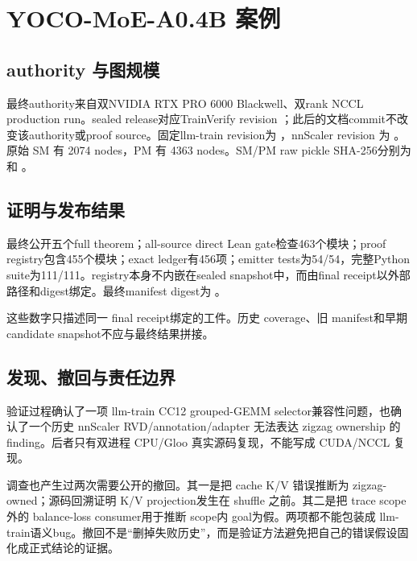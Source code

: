 \documentclass[10.5pt,a4paper]{ctexart}
\begin{document}
\section{YOCO-MoE-A0.4B 案例}

\subsection{authority 与图规模}

最终authority来自双NVIDIA RTX PRO 6000 Blackwell、双rank NCCL production run。sealed release对应TrainVerify revision ；此后的文档commit不改变该authority或proof source。固定llm-train revision为
，nnScaler revision 为
。原始 SM 有 2074 nodes，PM 有 4363 nodes。SM/PM raw pickle SHA-256分别为
和
。

\subsection{证明与发布结果}

最终公开五个full theorem；all-source direct Lean gate检查463个模块；proof registry包含455个模块；exact ledger有456项；emitter tests为54/54，完整Python suite为111/111。registry本身不内嵌在sealed snapshot中，而由final receipt以外部路径和digest绑定。最终manifest digest为
。

这些数字只描述同一 final receipt绑定的工件。历史 coverage、旧 manifest和早期 candidate snapshot不应与最终结果拼接。

\subsection{发现、撤回与责任边界}

验证过程确认了一项 llm-train CC12 grouped-GEMM selector兼容性问题，也确认了一个历史 nnScaler RVD/annotation/adapter 无法表达 zigzag ownership 的 finding。后者只有双进程 CPU/Gloo 真实源码复现，不能写成 CUDA/NCCL 复现。

调查也产生过两次需要公开的撤回。其一是把 cache K/V 错误推断为 zigzag-owned；源码回溯证明 K/V projection发生在 shuffle 之前。其二是把 trace scope外的 balance-loss consumer用于推断 scope内 goal为假。两项都不能包装成 llm-train语义bug。撤回不是“删掉失败历史”，而是验证方法避免把自己的错误假设固化成正式结论的证据。
\end{document}
